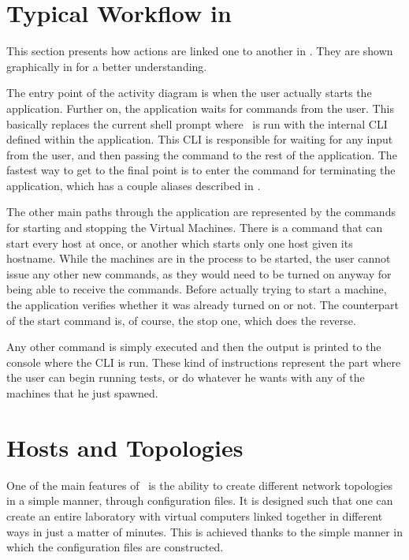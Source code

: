 \section{Typical Workflow in \project}
\label{sec:typical-workflow}

This section presents how actions are linked one to another in \project.
They are shown graphically in  for a better understanding.


The entry point of the activity diagram is when the user actually starts the application.
Further on, the application waits for commands from the user.
This basically replaces the current shell prompt where \project\ is run with the internal CLI defined within the application.
This CLI is responsible for waiting for any input from the user, and then passing the command to the rest of the application.
The fastest way to get to the final point is to enter the command for terminating the application, which has a couple aliases described in .

The other main paths through the application are represented by the commands for starting and stopping the Virtual Machines.
There is a command that can start every host at once, or another which starts only one host given its hostname.
While the machines are in the process to be started, the user cannot issue any other new commands, as they would need to be turned on anyway for being able to receive the commands.
Before actually trying to start a machine, the application verifies whether it was already turned on or not.
The counterpart of the start command is, of course, the stop one, which does the reverse.

Any other command is simply executed and then the output is printed to the console where the CLI is run.
These kind of instructions represent the part where the user can begin running tests, or do whatever he wants with any of the machines that he just spawned.

\section{Hosts and Topologies}
\label{sec:hosts-and-topologies}

One of the main features of \project\ is the ability to create different network topologies in a simple manner, through configuration files.
It is designed such that one can create an entire laboratory with virtual computers linked together in different ways in just a matter of minutes.
This is achieved thanks to the simple manner in which the configuration files are constructed.

